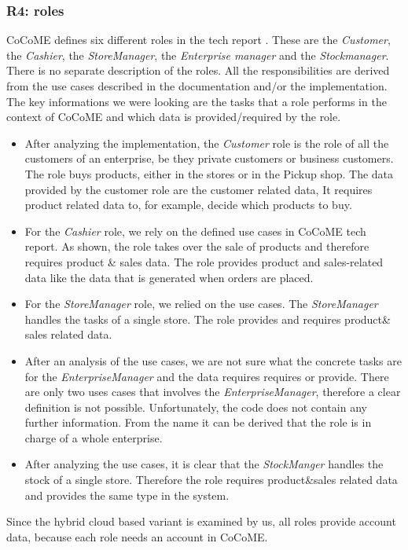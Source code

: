 \subsubsection{R4: roles}
\label{req_roles}
CoCoME defines six different roles in the tech report \cite{CoCoMETechReport}. These are the \textit{Customer}, the \textit{Cashier}, the \textit{StoreManager}, the \textit{Enterprise manager} and the \textit{Stockmanager}. There is no separate description of the roles. All the responsibilities are derived from the use cases described in the documentation and/or the implementation. The key informations we were looking are the tasks that a role performs in the context of CoCoME and which data is provided/required by the role. 
\begin{itemize}
\item  After analyzing the implementation, the \textit{Customer} role is the role of all the customers of an enterprise, be they private customers or business customers. The role buys products, either in the stores or in the Pickup shop. The data provided by the customer role are the customer related data, It requires product related data to, for example, decide which products to buy.
\item For the \textit{Cashier} role, we rely on the defined use cases in CoCoME tech report. As shown, the role takes over the sale of products and therefore requires product \& sales data. The role provides product and sales-related data like the data that is generated when orders are placed.
\item For the \textit{StoreManager} role, we relied on the use cases. The \textit{StoreManager} handles the tasks of a single store. The role provides and requires product\& sales related data.
\item After an analysis of the use cases, we are not sure what the concrete tasks are for the \textit{EnterpriseManager} and the data requires requires or provide. There are only two uses cases that involves the \textit{EnterpriseManager}, therefore a clear definition is not possible. Unfortunately, the code does not contain any further information. From the name it can be derived that the role is in charge of a  whole enterprise. 
\item After analyzing the use cases, it is clear that the \textit{StockManger} handles the stock of a single store. Therefore the role requires product\&sales related data and provides the same type in the system.
\end{itemize}
Since the hybrid cloud based variant is examined by us, all roles provide account data, because each role needs an account in CoCoME. 
